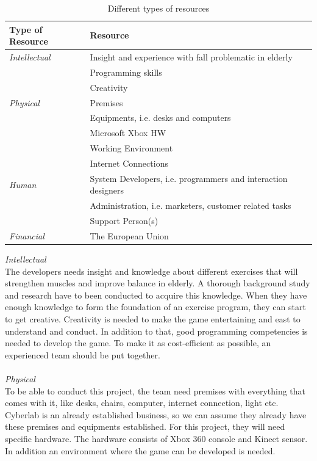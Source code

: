 \begin{table}
\centering
    \begin{tabular}{|l|l|}
        \hline
       \textbf{Type of Resource} & \textbf{Resource}  \\ \hline
       \emph{Intellectual} & Insight and experience with fall problematic in elderly \\ \cline{2-2}
        & Programming skills \\ \cline{2-2}
	 	& Creativity \\ \hline
	   \emph{Physical} & Premises \\ \cline{2-2}
	   	& Equipments, i.e. desks and computers \\ \cline{2-2}
	   	& Microsoft Xbox HW \\ \cline{2-2}
	   	& Working Environment \\ \cline{2-2}
	   	& Internet Connections \\ \hline
	   \emph{Human} & System Developers, i.e. programmers and interaction designers \\ \cline{2-2}
	   	& Administration, i.e. marketers, customer related tasks \\ \cline{2-2}
	   	& Support Person(s) \\ \hline
	   \emph{Financial} & The European Union \\
        \hline
    \end{tabular}
    \caption[Resources]{Different types of resources}
    \label{tab:Resources}
\end{table} 
\emph{Intellectual} \\ The developers needs insight and knowledge about different exercises that will strengthen muscles and improve balance in elderly. A thorough background study and research have to been conducted to acquire this knowledge. When they have enough knowledge to form the foundation of an exercise program, they can start to get creative. Creativity is needed to make the game entertaining and east to understand and conduct. In addition to that, good programming competencies is needed to develop the game. To make it as cost-efficient as possible, an experienced team should be put together. \\ \\
\emph{Physical} \\ To be able to conduct this project, the team need premises with everything that comes with it, like desks, chairs, computer, internet connection, light etc. Cyberlab is an already established business, so we can assume they already have these premises and equipments established. For this project, they will need specific hardware. The hardware consists of Xbox 360 console and Kinect sensor. In addition an environment where the game can be developed is needed. \\ \\
